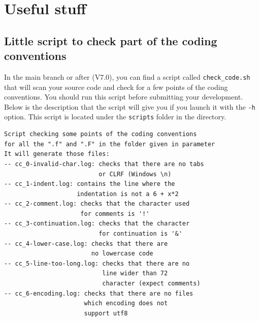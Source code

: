 %
\chapter{Useful stuff}
%
\section{Little script to check part of the coding conventions}
%
In the main branch or after (V7.0), you can find a script called
\verb!check_code.sh! that will scan your source code and check for a few points
of the coding conventions. You should run this script before submitting your
development. Below is the description that the script will give you if you
launch it with the \verb!-h! option. This script is located under the
\verb!scripts! folder in the \telemacsystem directory.
\begin{lstlisting}
Script checking some points of the coding conventions
for all the ".f" and ".F" in the folder given in parameter
It will generate those files:
-- cc_0-invalid-char.log: checks that there are no tabs
                          or CLRF (Windows \n)
-- cc_1-indent.log: contains the line where the
                    indentation is not a 6 + x*2
-- cc_2-comment.log: checks that the character used
                     for comments is '!'
-- cc_3-continuation.log: checks that the character
                          for continuation is '&'
-- cc_4-lower-case.log: checks that there are
                        no lowercase code
-- cc_5-line-too-long.log: checks that there are no
                           line wider than 72
                           character (expect comments)
-- cc_6-encoding.log: checks that there are no files
                      which encoding does not
                      support utf8
\end{lstlisting}

